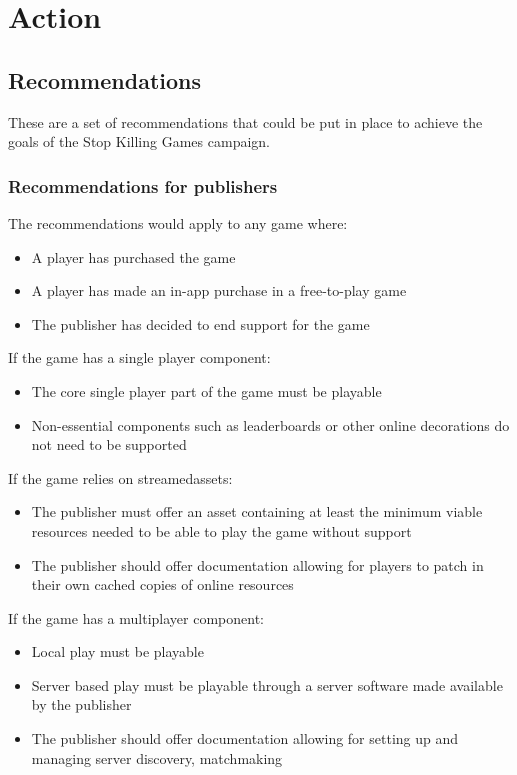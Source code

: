 \chapter{Action}

\section{Recommendations}
These are a set of recommendations that could be put in place to achieve the goals of the Stop Killing Games campaign.


\subsection{Recommendations for publishers}

The recommendations would apply to any game where:
\begin{itemize}
    \item A player has purchased the game
    \item A player has made an in-app purchase in a free-to-play game
    \item The publisher has decided to end support for the game
\end{itemize}

If the game has a single player component:
\begin{itemize}
    \item The core single player part of the game must be playable
    \item Non-essential components such as leaderboards or other online decorations do not need to be supported
\end{itemize}

If the game relies on \gls{streamedassets}:
\begin{itemize}
    \item The publisher must offer an asset containing at least the minimum viable resources needed to be able to play the game without support
    \item The publisher should offer documentation allowing for players to patch in their own cached copies of online resources
\end{itemize}

If the game has a multiplayer component:
\begin{itemize}
    \item Local play must be playable
    \item Server based play must be playable through a server software made available by the publisher
    \item The publisher should offer documentation allowing for setting up and managing server discovery, matchmaking
\end{itemize}

